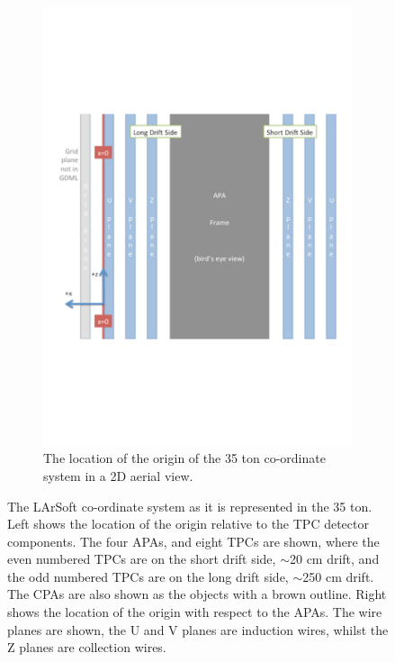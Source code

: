 \begin{figure}[h!]
\begin{subfigure}{0.45\textwidth}
    \includegraphics[width=\textwidth]{35ton_xCenter}
    \caption{The location of the origin of the 35 ton co-ordinate system in a 2D aerial view.}
  \end{subfigure}
  \caption[The LArSoft co-ordinate system as it is represented in the 35 ton.]
          {The LArSoft co-ordinate system as it is represented in the 35 ton. Left shows the location of the origin relative to the TPC detector components. The four APAs, and eight TPCs are shown, where the even numbered TPCs are on the short drift side, $\sim$20 cm drift, and the odd numbered TPCs are on the long drift side, $\sim$250 cm drift. The CPAs are also shown as the objects with a brown outline. Right shows the location of the origin with respect to the APAs. The wire planes are shown, the U and V planes are induction wires, whilst the Z planes are collection wires.}
  \label{fig:LArSoft_coords}
\end{figure}


